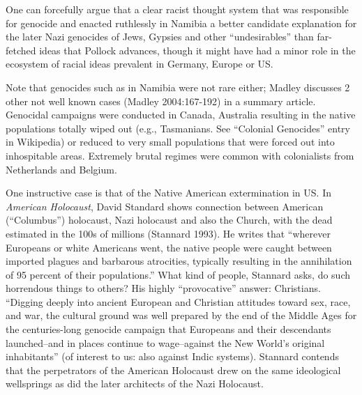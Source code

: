 One can forcefully argue that a clear racist thought system that was responsible for genocide and enacted ruthlessly in Namibia a better candidate explanation for the later Nazi genocides of  Jews, Gypsies and other “undesirables” than far-fetched ideas that Pollock advances, though it might have had a minor role in the ecosystem of racial ideas prevalent in Germany, Europe or US.

Note that genocides such as in Namibia were not rare either; Madley discusses 2 other not well known cases (Madley 2004:167-192) in a summary article. Genocidal campaigns were conducted in Canada, Australia resulting in the native populations totally wiped out (e.g., Tasmanians. See “Colonial Genocides” entry in Wikipedia) or reduced to very small populations that were forced out into inhospitable areas.  Extremely brutal regimes were common with colonialists from Netherlands and Belgium.

One instructive case is that of the Native American extermination in US.  In {\sl American Holocaust}, David Standard shows connection between American (“Columbus”) holocaust, Nazi holocaust and also the Church, with the dead estimated in the 100s of millions (Stannard 1993). He writes that “wherever Europeans or white Americans went, the native people were caught between imported plagues and barbarous atrocities, typically resulting in the annihilation of 95 percent of their populations.” What kind of people, Stannard asks, do such horrendous things to others? His highly “provocative” answer: Christians. “Digging deeply into ancient European and Christian attitudes toward sex, race, and war, the cultural ground was well prepared by the end of the Middle Ages for the centuries-long genocide campaign that Europeans and their descendants launched--and in places continue to wage--against the New World's original inhabitants” (of interest to us: also against Indic systems). Stannard contends that the perpetrators of the American Holocaust drew on the same ideological wellsprings as did the later architects of the Nazi Holocaust.

